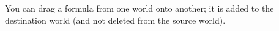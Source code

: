 \documentclass[11pt]{book}
\begin{document}
You can drag a formula from one world onto another; it is added to the destination world (and not deleted from the source world).








\end{document}
